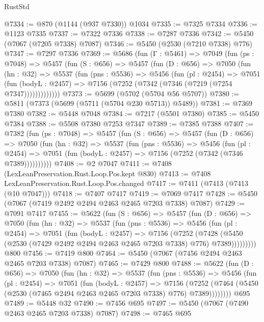 \begin{lexlean}{RustStd}
\begin{coremodule}
@7334 := @870 (@1144 (@937 @7330)) @1034
@7335 := @7325 @7334
@7336 := @1123 @7335
@7337 := @7322 @7336
@7338 := @7287 @7336
@7342 := @5450 (@7067 (@7205 @7338) @7087)
@7346 := @5450 (@2530 (@7210 @7338) @776)
@7347 := @7297 @7336
@7369 := @5686
    (fun (Γ : @5461) =>
    @7049
      (fun (ps : @7048) =>
      @5457
        (fun (S : @656) =>
        @5457
          (fun (D : @656) =>
          @7050
            (fun (hn : @32) =>
            @5537
              (fun (pns : @5536) =>
              @5456
                (fun (pl : @2454) =>
                @7051
                  (fun (bodyL : @2457) =>
                  @7156 (@7252 (@7342 (@7346 (@7219 (@7254 @7347)))))))))))))
@7373 := @5699 (@5702 (@5704 @56 @5707))
@7380 := @5811 (@7373 (@5699 (@5711 (@5704 @230 @5713)) @5489))
@7381 := @7369 @7380
@7382 := @5448 @7048
@7384 := @7217 (@5501 @7380)
@7385 := @5450 @7384
@7388 := @5508 @7380 @7253 @7347
@7389 := @7385 @7388
@7407 := @7382
    (fun (ps : @7048) =>
    @5457
      (fun (S : @656) =>
      @5457
        (fun (D : @656) =>
        @7050
          (fun (hn : @32) =>
          @5537
            (fun (pns : @5536) =>
            @5456
              (fun (pl : @2454) =>
              @7051 (fun (bodyL : @2457) => @7156 (@7252 (@7342 (@7346 @7389))))))))))
@7408 := @2 @7047
@7411 := @7408 (LexLeanPreservation.Rust.Loop.Pos.kept @830)
@7413 := @7408 LexLeanPreservation.Rust.Loop.Pos.changed
@7417 := @7411 (@7413 (@7413 (@10 @7047)))
@7418 := @7407 @7417
@7419 := @7069 @7417
@7428 := @5450 (@7067 (@7419 @2492 @2494 @2463 @2465 @7203 @7338) @7087)
@7429 := @7091 @7417
@7455 := @5622
    (fun (S : @656) =>
    @5457
      (fun (D : @656) =>
      @7050
        (fun (hn : @32) =>
        @5537
          (fun (pns : @5536) =>
          @5456
            (fun (pl : @2454) =>
            @7051
              (fun (bodyL : @2457) =>
              @7156
                (@7252
                  (@7428
                    (@5450 (@2530 (@7429 @2492 @2494 @2463 @2465 @7203 @7338) @776) @7389)))))))))
    @800
@7456 := @7419 @800
@7464 := @5450 (@7067 (@7456 @2494 @2463 @2465 @7203 @7338) @7087)
@7465 := @7429 @800
@7488 := @5622
    (fun (D : @656) =>
    @7050
      (fun (hn : @32) =>
      @5537
        (fun (pns : @5536) =>
        @5456
          (fun (pl : @2454) =>
          @7051
            (fun (bodyL : @2457) =>
            @7156
              (@7252 (@7464 (@5450 (@2530 (@7465 @2494 @2463 @2465 @7203 @7338) @776) @7389))))))))
    @695
@7489 := @5448 @32
@7490 := @7456 @695
@7497 := @5450 (@7067 (@7490 @2463 @2465 @7203 @7338) @7087)
@7498 := @7465 @695

\end{coremodule}
\end{lexlean}
